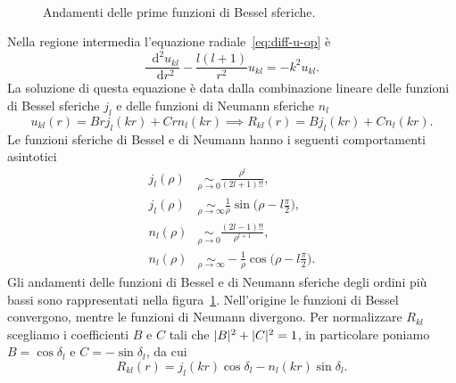 \documentclass[a4paper,fleqn,twoside,12pt]{article}
\newcommand*{\dd}{\mathop{}\!\mathrm{d}} %
\DeclarePairedDelimiter{\abs}{\lvert}{\rvert}
\newcommand*{\toder}[3][]{\frac{{\dd^{#1}}#2}{\dd {#3}^{#1}}}
\begin{document}
\begin{figure}
  \centering
  \\
  \caption{Andamenti delle prime funzioni di Bessel sferiche.}
  \label{fig:bessel}
\end{figure}
Nella regione intermedia l'equazione radiale~\eqref{eq:diff-u-op} è
\begin{equation}
  \toder[2]{u_{kl}}{r} - \frac{l(l+1)}{r^{2}}u_{kl} = -k^{2}u_{kl}.
\end{equation}
La soluzione di questa equazione è data dalla combinazione lineare delle
funzioni di Bessel sferiche $j_{l}$ e delle funzioni di Neumann sferiche $n_{l}$
\begin{equation}
  u_{kl}(r) = Brj_{l}(kr) + Crn_{l}(kr) \implies R_{kl}(r) = Bj_{l}(kr) +
  Cn_{l}(kr).
\end{equation}
Le funzioni sferiche di Bessel e di Neumann hanno i seguenti comportamenti
asintotici
\begin{subequations}
  \label{eq:asintoti-bessel}
  \begin{align}
    \label{eq:jl-asintotico-orig}
    j_{l}(\rho) &\underset{\rho \to 0}{\sim} \frac{\rho^{l}}{(2l+1)!!}, \\
    \label{eq:jl-asintotico-inf}
    j_{l}(\rho) &\underset{\rho \to \infty}{\sim} \frac{1}{\rho} \sin\bigg(\rho
    - l \frac{\pi}{2}\bigg), \\
    n_{l}(\rho) &\underset{\rho \to 0}{\sim} \frac{(2l-1)!!}{\rho^{l+1}}, \\
    n_{l}(\rho) &\underset{\rho \to \infty}{\sim} -\frac{1}{\rho}\cos\bigg(\rho
    - l \frac{\pi}{2}\bigg).
  \end{align}
\end{subequations}
Gli andamenti delle funzioni di Bessel e di Neumann sferiche degli ordini più
bassi sono rappresentati nella figura~\ref{fig:bessel}.  Nell'origine le
funzioni di Bessel convergono, mentre le funzioni di Neumann divergono.  Per
normalizzare $R_{kl}$ scegliamo i coefficienti $B$ e $C$ tali che
$\abs{B}^{2} + \abs{C}^{2} = 1$, in particolare poniamo $B = \cos\delta_{l}$ e
$C = -\sin\delta_{l}$, da cui
\begin{equation}
  \label{eq:R-intermedio}
  R_{kl}(r) = j_{l}(kr)\cos\delta_{l} - n_{l}(kr)\sin\delta_{l}.
\end{equation}
\end{document}
